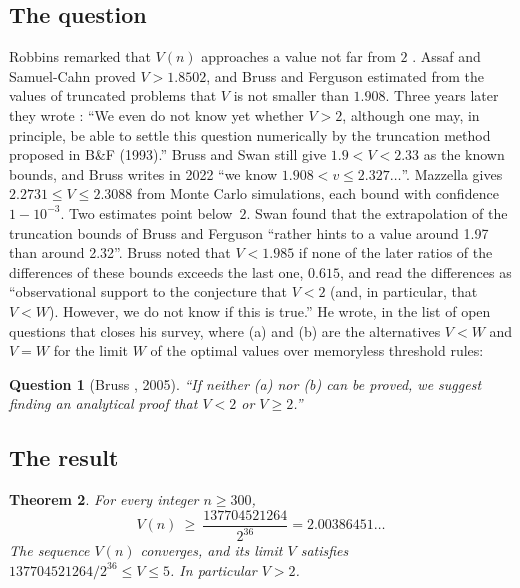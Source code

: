 \documentclass[11pt]{amsart}
\newtheorem{theorem}{Theorem}[section]
\newtheorem{question}[theorem]{Question}
\theoremstyle{definition}
\numberwithin{equation}{section}
\newcommand{\lean}[1]{\ignorespaces}
\begin{document}
\subsection*{The question}
Robbins remarked that $V(n)$ approaches a value not far from $2$ \cite[Section~2]{Bruss05}. Assaf and Samuel-Cahn \cite[Theorem~3.3]{AS96} proved $V>1.8502$, and Bruss and Ferguson \cite[p.~616, and Table~3, p.~625]{BF93} estimated from the values of truncated problems that $V$ is not smaller than $1.908$. Three years later they wrote \cite[p.~7]{BF96}: ``We even do not know yet whether $V > 2$, although one may, in principle, be able to settle this question numerically by the truncation method proposed in B\&F (1993).'' Bruss and Swan \cite[Section~3, p.~8]{BS09} still give $1.9<V<2.33$ as the known bounds, and Bruss \cite[Section~3, p.~6]{Bruss22} writes in 2022 ``we know $1.908<v\le2.327\ldots$''. Mazzella \cite[Theorems~3 and~4]{Mazzella26} gives $2.2731\le V\le2.3088$ from Monte Carlo simulations, each bound with confidence $1-10^{-3}$. Two estimates point below~$2$. Swan \cite[Part~II, Section~1.6, p.~66]{Swan07} found that the extrapolation of the truncation bounds of Bruss and Ferguson ``rather hints to a value around 1.97 than around 2.32''. Bruss \cite[Section~6.2, p.~115]{Bruss05} noted that $V<1.985$ if none of the later ratios of the differences of these bounds exceeds the last one, $0.615$, and read the differences as ``observational support to the conjecture that $V<2$ (and, in particular, that $V<W$). However, we do not know if this is true.'' He wrote, in the list of open questions that closes his survey, where (a) and (b) are the alternatives $V<W$ and $V=W$ for the limit $W$ of the optimal values over memoryless threshold rules:

\begin{question}[{Bruss \cite[Section~8, p.~119]{Bruss05}, 2005}]\label{q:bruss}
``If neither (a) nor (b) can be proved, we suggest finding an analytical proof that $V<2$ or $V\ge2$.''
\end{question}

\subsection*{The result}
\begin{theorem}\label{thm:main}\lean{Robbins.main_so, Robbins.main_limit, Robbins.two_lt_limit, Robbins.two_lt_v, Robbins.v300, Robbins.exists_tendsto_v, Robbins.v_le_five, Robbins.lower_bound_of_base, Robbins.main_so_limit, Robbins.limit_lower_bound_of_base, Robbins.RelaxedSubSolution.val_one_le_v, Robbins.v_mono, Robbins.Cert.SO.relaxed_of_tables}
For every integer $n\ge300$,
\[
V(n)\ \ge\ \frac{137704521264}{2^{36}}=2.00386451\ldots
\]
The sequence $V(n)$ converges, and its limit $V$ satisfies $137704521264/2^{36}\le V\le5$. In particular $V>2$.
\end{theorem}
\end{document}
